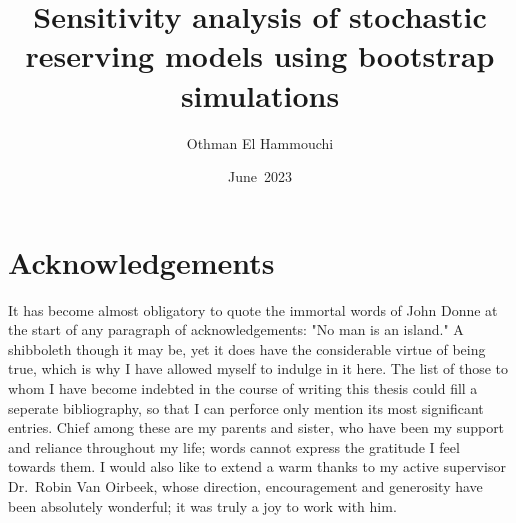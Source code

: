 \documentclass[a4paper]{book}
\title{Sensitivity analysis of stochastic reserving models using bootstrap simulations}
\author{Othman El Hammouchi}
\date{June~2023}
\begin{document}
\frontmatter

\thispagestyle{empty}
\maketitle%

\renewcommand\title{Gevoeligheidsanalyse van stochastische schadereserveringsmodellen aan de hand van bootstrap-simulaties}
\renewcommand\pretitle{\flushleft{Proefschrift ingediend met het oog op het behalen van de graad van Master of Science in de Wiskunde}}%
\renewcommand\date{Juni~2023}%
\renewcommand\promotors{Promotors: dr.\ Robin Van Oirbeek \and prof.\ dr.\ Tim Verdonck \and prof.\ dr.\ Mark Sioen}
\renewcommand\faculty{Wetenschappen en Bio-ingenieurswetenschappen}%

\thispagestyle{empty}
\maketitle%

%

\chapter{Acknowledgements}

It has become almost obligatory to quote the immortal words of John Donne at the start of any paragraph of acknowledgements: "No man is an island." A shibboleth though it may be, yet it does have the considerable virtue of being true, which is why I have allowed myself to indulge in it here. The list of those to whom I have become indebted in the course of writing this thesis could fill a seperate bibliography, so that I can perforce only mention its most significant entries. Chief among these are my parents and sister, who have been my support and reliance throughout my life; words cannot express the gratitude I feel towards them. I would also like to extend a warm thanks to my active supervisor Dr.\ Robin Van Oirbeek, whose direction, encouragement and generosity have been absolutely wonderful; it was truly a joy to work with him.
\end{document}
